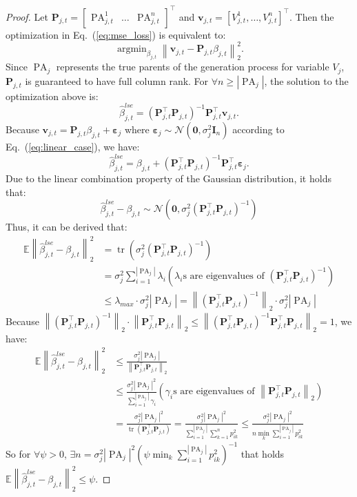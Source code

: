 \documentclass{article}
\theoremstyle{plain}
\theoremstyle{definition}
\theoremstyle{remark}
\def \Eq {Eq.}
\def \P {\mathbf{P}}
\def \I {\mathbf{I}}
\def \PA {\operatorname{PA}}
\def \P {\mathbf{P}}
\def \v {\mathbf{v}}
\begin{document}
\begin{proof}
  Let $\P_{j,t} = \begin{bmatrix}\PA^{1}_{j, t} & \ldots& \PA^{n}_{j, t} \end{bmatrix}^\top$ and $\v_{j,t} = \left[V^{1}_{j, t}, \ldots, V^{n}_{j, t}\right]^\top$. 
  Then the optimization in \Eq~(\ref{eq:mse_loss}) is equivalent to:
  \[
    \mathop{\arg\min}_{\beta_{j,t}}  \left\|\v_{j,t}-\P_{j,t}\beta_{j,t}\right\|_2^2.
  \]
  Since $\PA_{j}$ represents the true parents of the generation process for variable $V_j$, $\P_{j,t}$ is guaranteed to have full column rank. 
  For $\forall n\geq \left|\PA_{j}\right|$, the solution to the optimization above is:
  \[
    \hat{\beta}^{lse}_{j, t} = \left(\P^\top_{j,t}\P_{j,t}\right)^{-1}\P^\top_{j,t}\v_{j,t}.
  \]
  Because $\v_{j,t} = \P_{j,t}\beta_{j, t} + \bm{\varepsilon}_j$ where $\bm{\varepsilon}_j\sim\mathcal{N}\left(\bm{0}, \sigma^2_j\I_{n}\right)$ according to \Eq~(\ref{eq:linear_case}), 
  we have:
  \[
    \hat{\beta}^{lse}_{j, t} = \beta_{j, t} + \left(\P^\top_{j,t}\P_{j,t}\right)^{-1}\P^\top_{j,t}\bm{\varepsilon}_j.
  \]
  Due to the linear combination property of the Gaussian distribution, it holds that:
  \[
    \hat{\beta}^{lse}_{j, t} - \beta_{j, t} \sim  \mathcal{N}\left(\bm{0}, \sigma^2_j\left(\P^\top_{j,t}\P_{j,t}\right)^{-1}\right)
  \]
  Thus, it can be derived that:
  \[
    \begin{aligned}
      \mathbb{E}\left\|\hat{\beta}^{lse}_{j, t} - \beta_{j, t}\right\|^2_2 
      &= \operatorname*{tr}\left(\sigma^2_j\left(\P^\top_{j,t}\P_{j,t}\right)^{-1}\right)\\
      &= \sigma^2_j \sum_{i=1}^{|\PA_j|}\lambda_i  \left(\text{$\lambda_i$s are eigenvalues of }\left(\P^\top_{j,t}\P_{j,t}\right)^{-1}\right)\\
      &\leq \lambda_{max}\cdot\sigma^2_j|\PA_j| = \left\|\left(\P^\top_{j,t}\P_{j,t}\right)^{-1}\right\|_2\cdot\sigma^2_j|\PA_j|
    \end{aligned}
  \]
  Because $\left\|\left(\P^\top_{j,t}\P_{j,t}\right)^{-1}\right\|_2\cdot \left\|\P^\top_{j,t}\P_{j,t}\right\|_2 \leq \left\|\left(\P^\top_{j,t}\P_{j,t}\right)^{-1}\P^\top_{j,t}\P_{j,t}\right\|_2 = 1$, we have:
  \[
    \begin{aligned}
      \mathbb{E}\left\|\hat{\beta}^{lse}_{j, t} - \beta_{j, t}\right\|^2_2 
      &\leq \frac{\sigma^2_j|\PA_j|}{\left\|\P^\top_{j,t}\P_{j,t}\right\|_2}\\
      &\leq \frac{\sigma^2_j|\PA_j|^2}{\sum_{i=1}^{|\PA_j|}\gamma_i} \left(\text{$\gamma_i$s are eigenvalues of }    \left\|\P^\top_{j,t}\P_{j,t}\right\|_2\right)\\
      &= \frac{\sigma^2_j|\PA_j|^2}{\operatorname*{tr}\left(\P^\top_{j,t}\P_{j,t}\right)}
      = \frac{\sigma^2_j|\PA_j|^2}{\sum_{i=1}^{|\PA_j|}\sum_{k=1}^{n}p_{ik}^2 }\leq \frac{\sigma^2_j|\PA_j|^2}{n \min_k \sum_{i=1}^{|\PA_j|}p_{ik}^2 }
    \end{aligned}
  \]
  So for $\forall \psi > 0$, $\exists n = \sigma^2_j|\PA_j|^2\left(\psi \min_k \sum_{i=1}^{|\PA_j|}p_{ik}^2 \right)^{-1}$ that holds $\mathbb{E}\left\|\hat{\beta}^{lse}_{j, t} - \beta_{j, t}\right\|^2_2 \leq \psi$. 
\end{proof}
\end{document}
